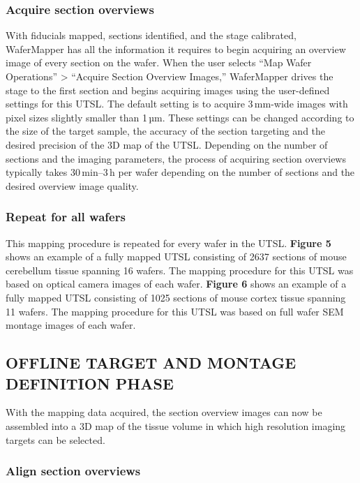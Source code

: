 \documentclass{article}
\begin{document}
\subsubsection*{Acquire section overviews}

With fiducials mapped, sections identified, and the stage calibrated, WaferMapper has all the information it requires to begin acquiring an overview image of every section on the wafer. When the user selects “Map Wafer Operations” > “Acquire Section Overview Images,” WaferMapper drives the stage to the first section and begins acquiring images using the user-defined settings for this UTSL. The default setting is to acquire 3\,mm-wide images with pixel sizes slightly smaller than 1\,µm. These settings can be 
changed according to the size of the target sample, the accuracy of the section targeting and the desired precision of the 3D map of the UTSL. Depending on the number of sections and the imaging parameters, the process of acquiring section overviews typically takes 30\,min–3\,h per wafer depending on the number of sections and the desired overview image quality.

\subsubsection*{Repeat for all wafers}

This mapping procedure is repeated for every wafer in the UTSL. \textbf{Figure 5} shows an example of a fully mapped UTSL consisting of 2637 sections of mouse cerebellum tissue spanning 16 wafers. The mapping procedure for this UTSL was based on optical camera images of each wafer. \textbf{Figure 6} shows an example of a fully mapped UTSL consisting of 1025 sections of mouse cortex tissue spanning 11 wafers. The mapping procedure for this UTSL was based on full wafer SEM montage images of each wafer.

\subsection*{OFFLINE TARGET AND MONTAGE DEFINITION PHASE}

With the mapping data acquired, the section overview images can now be assembled into a 3D map of the tissue volume in which high resolution imaging targets can be selected.

\subsubsection*{Align section overviews}
\end{document}
